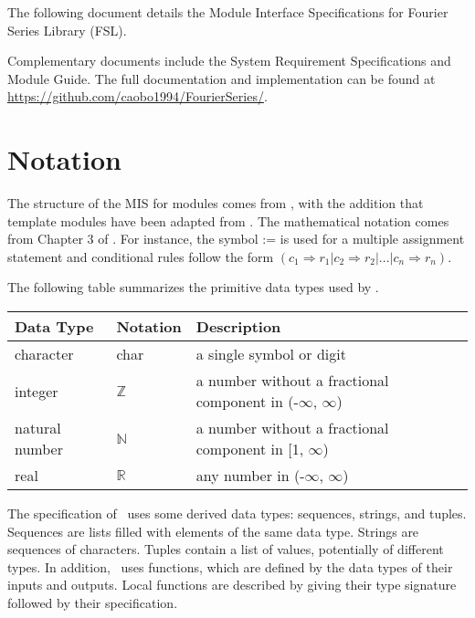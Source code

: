 \documentclass[12pt, titlepage]{article}
\begin{document}
The following document details the Module Interface Specifications for
Fourier Series Library (FSL).

Complementary documents include the System Requirement Specifications
and Module Guide.  The full documentation and implementation can be
found at \url{https://github.com/caobo1994/FourierSeries/}.

\section{Notation}

The structure of the MIS for modules comes from \citet{HoffmanAndStrooper1995},
with the addition that template modules have been adapted from
\cite{GhezziEtAl2003}.  The mathematical notation comes from Chapter 3 of
\citet{HoffmanAndStrooper1995}.  For instance, the symbol := is used for a
multiple assignment statement and conditional rules follow the form $(c_1
\Rightarrow r_1 | c_2 \Rightarrow r_2 | ... | c_n \Rightarrow r_n )$.

The following table summarizes the primitive data types used by \progname. 

\begin{center}
\renewcommand{\arraystretch}{1.2}
\noindent 
\begin{tabular}{l l p{7.5cm}} 
\toprule 
\textbf{Data Type} & \textbf{Notation} & \textbf{Description}\\ 
\midrule
character & char & a single symbol or digit\\
integer & $\mathbb{Z}$ & a number without a fractional component in (-$\infty$, $\infty$) \\
natural number & $\mathbb{N}$ & a number without a fractional component in [1, $\infty$) \\
real & $\mathbb{R}$ & any number in (-$\infty$, $\infty$)\\
\bottomrule
\end{tabular} 
\end{center}

\noindent
The specification of \progname \ uses some derived data types: sequences, strings, and
tuples. Sequences are lists filled with elements of the same data type. Strings
are sequences of characters. Tuples contain a list of values, potentially of
different types. In addition, \progname \ uses functions, which
are defined by the data types of their inputs and outputs. Local functions are
described by giving their type signature followed by their specification.
\end{document}
